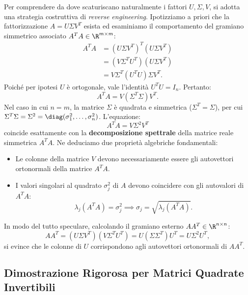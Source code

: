 Per comprendere da dove scaturiscano naturalmente i fattori $U, \Sigma, V$, si adotta una strategia costruttiva di \textit{reverse engineering}. Ipotizziamo a priori che la fattorizzazione $A = U \Sigma V^T$ esista ed esaminiamo il comportamento del gramiano simmetrico associato $A^T A \in \R^{m \times m}$:
\begin{align}
    A^T A &= (U \Sigma V^T)^T (U \Sigma V^T) \nonumber \\
          &= (V \Sigma^T U^T)(U \Sigma V^T) \nonumber \\
          &= V \Sigma^T (U^T U) \Sigma V^T.
\end{align}
Poich\'e per ipotesi $U$ \`e ortogonale, vale l'identit\`a $U^T U = I_n$. Pertanto:
\begin{equation}
    A^T A = V (\Sigma^T \Sigma) V^T.
\end{equation}
Nel caso in cui $n = m$, la matrice $\Sigma$ \`e quadrata e simmetrica ($\Sigma^T = \Sigma$), per cui $\Sigma^T \Sigma = \Sigma^2 = \diag(\sigma_1^2, \dots, \sigma_n^2)$. 
L'equazione:
\begin{equation}
    A^T A = V \Sigma^2 V^T
\end{equation}
coincide esattamente con la \textbf{decomposizione spettrale} della matrice reale simmetrica $A^T A$. Ne deduciamo due propriet\`a algebriche fondamentali:
\begin{itemize}
    \item Le colonne della matrice $V$ devono necessariamente essere gli autovettori ortonormali della matrice $A^T A$.
    \item I valori singolari al quadrato $\sigma_j^2$ di $A$ devono coincidere con gli autovalori di $A^T A$:
    \begin{equation}
        \lambda_j(A^T A) = \sigma_j^2 \implies \sigma_j = \sqrt{\lambda_j(A^T A)}.
    \end{equation}
\end{itemize}

In modo del tutto speculare, calcolando il gramiano esterno $A A^T \in \R^{n \times n}$:
\begin{equation}
    A A^T = (U \Sigma V^T)(V \Sigma^T U^T) = U (\Sigma \Sigma^T) U^T = U \Sigma^2 U^T,
\end{equation}
si evince che le colonne di $U$ corrispondono agli autovettori ortonormali di $A A^T$.

\subsection{Dimostrazione Rigorosa per Matrici Quadrate Invertibili}

